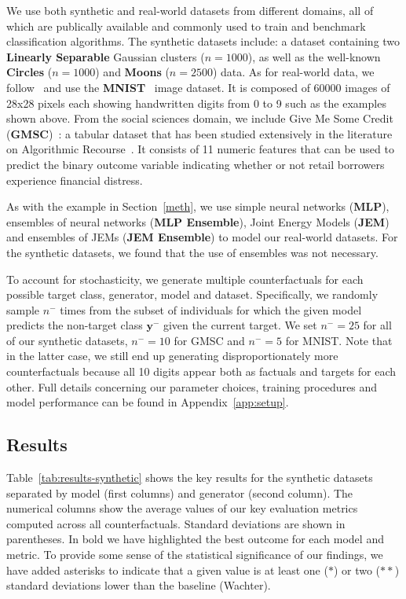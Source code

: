 \documentclass{article}
\begin{document}
We use both synthetic and real-world datasets from different domains, all of which are publically available and commonly used to train and benchmark classification algorithms. The synthetic datasets include: a dataset containing two \textbf{Linearly Separable} Gaussian clusters ($n=1000$), as well as the well-known \textbf{Circles} ($n=1000$) and \textbf{Moons} ($n=2500$) data. As for real-world data, we follow~\citet{schut2021generating} and use the \textbf{MNIST}~\citep{lecun1998mnist} image dataset. It is composed of 60000 images of 28x28 pixels each showing handwritten digits from 0 to 9 such as the examples shown above. From the social sciences domain, we include Give Me Some Credit (\textbf{GMSC})~\citep{kaggle2011give}: a tabular dataset that has been studied extensively in the literature on Algorithmic Recourse~\citep{pawelczyk2021carla}. It consists of 11 numeric features that can be used to predict the binary outcome variable indicating whether or not retail borrowers experience financial distress. 

As with the example in Section~\ref{meth}, we use simple neural networks (\textbf{MLP}), ensembles of neural networks (\textbf{MLP Ensemble}), Joint Energy Models (\textbf{JEM}) and ensembles of JEMs (\textbf{JEM Ensemble}) to model our real-world datasets. For the synthetic datasets, we found that the use of ensembles was not necessary. 

To account for stochasticity, we generate multiple counterfactuals for each possible target class, generator, model and dataset. Specifically, we randomly sample $n^{-}$ times from the subset of individuals for which the given model predicts the non-target class $\mathbf{y}^{-}$ given the current target. We set $n^{-}=25$ for all of our synthetic datasets, $n^{-}=10$ for GMSC and $n^{-}=5$ for MNIST. Note that in the latter case, we still end up generating disproportionately more counterfactuals because all 10 digits appear both as factuals and targets for each other. Full details concerning our parameter choices, training procedures and model performance can be found in Appendix~\ref{app:setup}.

\subsection{Results}

Table~\ref{tab:results-synthetic} shows the key results for the synthetic datasets separated by model (first columns) and generator (second column). The numerical columns show the average values of our key evaluation metrics computed across all counterfactuals. Standard deviations are shown in parentheses. In bold we have highlighted the best outcome for each model and metric. To provide some sense of the statistical significance of our findings, we have added asterisks to indicate that a given value is at least one ($*$) or two ($**$) standard deviations lower than the baseline (Wachter).
\end{document}
